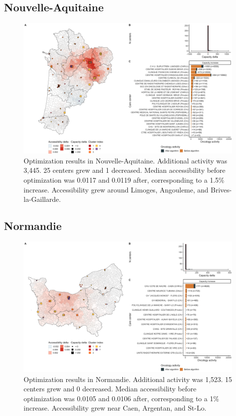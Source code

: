 \subsection*{Nouvelle-Aquitaine}

\begin{figure}[h]
    \includegraphics[width=\textwidth]{images/camion/optim_region/optim_Nouvelle-Aquitaine.png}
    \centering
    \caption{
        Optimization results in Nouvelle-Aquitaine. Additional activity was 3,445. 25 centers grew and 1 decreased. Median accessibility before optimization was 0.0117 and 0.0119 after, corresponding to a 1.5\% increase. Accessibility grew around Limoges, Angouleme, and Brives-la-Gaillarde.
    }
\end{figure}

\subsection*{Normandie}

\begin{figure}[h]
    \includegraphics[width=\textwidth]{images/camion/optim_region/optim_Normandie.png}
    \centering
    \caption{
        Optimization results in Normandie. Additional activity was 1,523. 15 centers grew and 0 decreased. Median accessibility before optimization was 0.0105 and 0.0106 after, corresponding to a 1\% increase. Accessibility grew near Caen, Argentan, and St-Lo.
    }
\end{figure}

